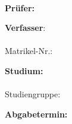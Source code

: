 

\begin{titlepage}

\begin{center}


\large {\institution}

\large {\dokumententyp}


~\vspace{1.5cm}\\

\LARGE \textbf{\dokumententitel}

\LARGE {\dokumentenuntertitel}

\vspace{2cm}


\large \textbf{Prüfer:}\\{\dokumentenpruefer}

\large \textbf{Verfasser}:\\{\dokumentenautor}\\Matrikel-Nr.: {\matrikelnr}\\{\dokumentenautoradresse}

\large \textbf{Studium:}\\{\studiengang}\\Studiengruppe: {\studiengruppe}

\large \textbf{Abgabetermin:}\\{\abgabedatum}


\end{center}


\end{titlepage}


